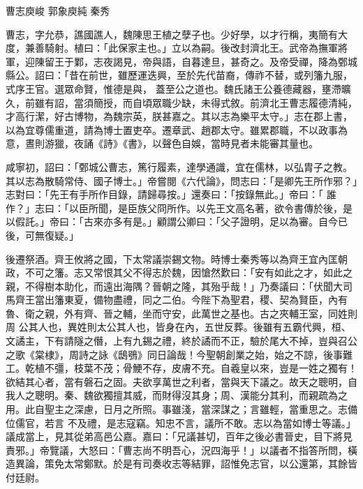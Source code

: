 
\begin{pinyinscope}
曹志庾峻
 郭象庾純
 秦秀



 曹志，字允恭，譙國譙人，魏陳思王植之孽子也。少好學，以才行稱，夷簡有大度，兼善騎射。植曰：「此保家主也。」立以為嗣。後改封濟北王。武帝為撫軍將軍，迎陳留王于鄴，志夜謁見，帝與語，自暮達旦，甚奇之。及帝受禪，降為鄄城縣公。詔曰：「昔在前世，雖歷運迭興，至於先代苗裔，傳祚不替，或列籓九服，式序王官。選眾命賢，惟德是與，
 蓋至公之道也。魏氏諸王公養德藏器，壅滯曠久，前雖有詔，當須簡授，而自頃眾職少缺，未得式敘。前濟北王曹志履德清純，才高行潔，好古博物，為魏宗英，朕甚嘉之。其以志為樂平太守。」志在郡上書，以為宜尊儒重道，請為博士置吏卒。遷章武、趙郡太守。雖累郡職，不以政事為意，晝則游獵，夜誦《詩》《書》，以聲色自娛，當時見者未能審其量也。



 咸寧初，詔曰：「鄄城公曹志，篤行履素，達學通識，宜在儒林，以弘胄子之教。其以志為散騎常侍、國子博士。」帝嘗閱《六代論》，問志曰：「是卿先王所作邪？」志對曰：「先王有手所作目錄，請歸尋按。」還奏曰：「按錄無此。」帝曰：「
 誰作？」志曰：「以臣所聞，是臣族父冏所作。以先王文高名著，欲令書傳於後，是以假託。」帝曰：「古來亦多有是。」顧謂公卿曰：「父子證明，足以為審。自今已後，可無復疑。」



 後遷祭酒。齊王攸將之國，下太常議崇錫文物。時博士秦秀等以為齊王宜內匡朝政，不可之籓。志又常恨其父不得志於魏，因愴然歎曰：「安有如此之才，如此之親，不得樹本助化，而遠出海隅？晉朝之隆，其殆乎哉！」乃奏議曰：「伏聞大司馬齊王當出籓東夏，備物盡禮，同之二伯。今陛下為聖君，稷、契為賢臣，內有魯、衛之親，外有齊、晉之輔，坐而守安，此萬世之基也。古之夾輔王室，同姓則周
 公其人也，異姓則太公其人也，皆身在內，五世反葬。後雖有五霸代興，桓、文譎主，下有請隧之僭，上有九錫之禮，終於譎而不正，驗於尾大不掉，豈與召公之歌《棠棣》，周詩之詠《鴟鴞》同日論哉！今聖朝創業之始，始之不諒，後事難工。乾植不彊，枝葉不茂；骨鯁不存，皮膚不充。自羲皇以來，豈是一姓之獨有！欲結其心者，當有磐石之固。夫欲享萬世之利者，當與天下議之。故天之聰明，自我人之聰明。秦、魏欲獨擅其威，而財得沒其身；周、漢能分其利，而親疏為之用。此自聖主之深慮，日月之所照。事雖淺，當深謀之；言雖輕，當重思之。志備位儒官，若言
 不及禮，是志寇竊。知忠不言，議所不敢。志以為當如博士等議。」議成當上，見其從弟高邑公嘉。嘉曰：「兄議甚切，百年之後必書晉史，目下將見責邪。」帝覽議，大怒曰：「曹志尚不明吾心，況四海乎！」以議者不指答所問，橫造異論，策免太常鄭默。於是有司奏收志等結罪，詔惟免志官，以公還第，其餘皆付廷尉。




\end{pinyinscope}

